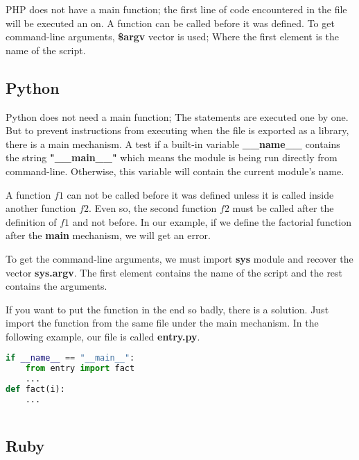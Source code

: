 \documentclass{KodeBook}
\begin{document}
PHP does not have a main function; the first line of code encountered in the file will be executed an on.
A function can be called before it was defined. 
To get command-line arguments, \textbf{\$argv} vector is used; Where the first element is the name of the script.



\subsection{Python}

Python does not need a main function; The statements are executed one by one. 
But to prevent instructions from executing when the file is exported as a library, there is a main mechanism. 
A test if a built-in variable \textbf{\_\_name\_\_} contains the string \textbf{"\_\_main\_\_"} which means the module is being run directly from command-line.
Otherwise, this variable will contain the current module's name.

A function $ f1 $ can not be called before it was defined unless it is called inside another function $ f2 $. 
Even so, the second function $ f2 $ must be called after the definition of $ f1 $ and not before. 
In our example, if we define the factorial function after the \textbf{main} mechanism, we will get an error. 

To get the command-line arguments, we must import \textbf{sys} module and recover the vector \textbf{sys.argv}. 
The first element contains the name of the script and the rest contains the arguments.



If you want to put the function in the end so badly, there is a solution. 
Just import the function from the same file under the main mechanism. 
In the following example, our file is called \textbf{entry.py}.

\begin{lstlisting}[language=Python, style=codeStyle]
if __name__ == "__main__":
	from entry import fact
	...
def fact(i):
	...
	
\end{lstlisting}

\subsection{Ruby}
\end{document}
